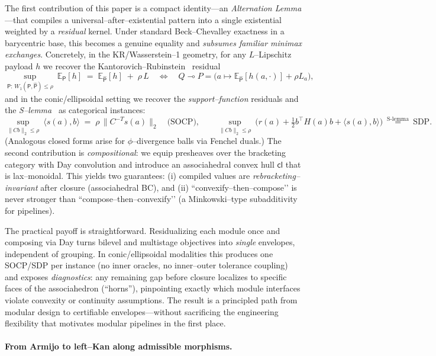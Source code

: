 \documentclass[11pt]{article}
\numberwithin{equation}{section}
\theoremstyle{upright}
\newcommand{\resid}{\multimap}
\begin{document}
The first contribution of this paper is a compact identity—an \emph{Alternation Lemma}—that compiles a universal–after–existential pattern into a single existential weighted by a \emph{residual} kernel. Under standard Beck--Chevalley exactness in a barycentric base, this becomes a genuine equality and \emph{subsumes familiar minimax exchanges}. Concretely, in the KR/Wasserstein--1 geometry, for any $L$–Lipschitz payload $h$ we recover the Kantorovich–Rubinstein~\cite{Villani2009} residual
\[
\sup_{\mathsf P:\,W_1(\mathsf P,\widehat{\mathsf P})\le \rho}\ \mathbb E_{\mathsf P}[h]
\;=\;\mathbb E_{\widehat{\mathsf P}}[h]\;+\;\rho\,L
\quad\Longleftrightarrow\quad
Q\resid P=\big(a\mapsto \mathbb E_{\widehat{\mathsf P}}[h(a,\cdot)]+\rho L_a\big),
\]
and in the conic/ellipsoidal setting we recover the \emph{support–function} residuals and the \emph{S–lemma}~\cite{PolikTerlaky2007} as categorical instances:
\[
\sup_{\|C b\|_2\le \rho}\ \langle s(a),b\rangle
\;=\;\rho\,\|C^{-T}s(a)\|_2
\quad\text{(SOCP)},\qquad
\sup_{\|C b\|_2\le \rho}\ \Big(r(a)+\tfrac12 b^\top H(a)b+\langle s(a),b\rangle\Big)
\ \overset{\mathrm{S\text{-}lemma}}{=}\ \text{SDP}.
\]
(Analogous closed forms arise for $\phi$–divergence balls via Fenchel duals.) The second contribution is \emph{compositional}: we equip presheaves over the bracketing category with Day convolution and introduce an associahedral convex hull $\mathsf{cl}$ that is lax–monoidal. This yields two guarantees: (i) compiled values are \emph{rebracketing–invariant} after closure (associahedral BC), and (ii) “convexify–then–compose’’ is never stronger than “compose–then–convexify’’ (a Minkowski–type subadditivity for pipelines).

The practical payoff is straightforward. Residualizing each module once and composing via Day turns bilevel and multistage objectives into \emph{single} envelopes, independent of grouping. In conic/ellipsoidal modalities this produces one SOCP/SDP per instance (no inner oracles, no inner--outer tolerance coupling) and exposes \emph{diagnostics}: any remaining gap before closure localizes to specific faces of the associahedron (``horns''), pinpointing exactly which module interfaces violate convexity or continuity assumptions. The result is a principled path from modular design to certifiable envelopes—without sacrificing the engineering flexibility that motivates modular pipelines in the first place.

\paragraph{From Armijo to left--Kan along admissible morphisms.}
\end{document}
